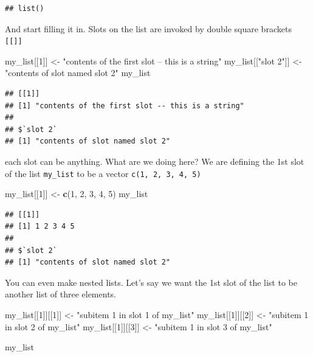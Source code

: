 \documentclass[]{book}
\newenvironment{Shaded}{\begin{snugshade}}{\end{snugshade}}
\newcommand{\KeywordTok}[1]{\textcolor[rgb]{0.13,0.29,0.53}{\textbf{#1}}}
\newcommand{\DecValTok}[1]{\textcolor[rgb]{0.00,0.00,0.81}{#1}}
\newcommand{\StringTok}[1]{\textcolor[rgb]{0.31,0.60,0.02}{#1}}
\newcommand{\NormalTok}[1]{#1}
\theoremstyle{definition}
\theoremstyle{definition}
\theoremstyle{definition}
\theoremstyle{remark}
\begin{document}
\begin{verbatim}
## list()
\end{verbatim}

And start filling it in. Slots on the list are invoked by double square
brackets \texttt{{[}{[}{]}{]}}

\begin{Shaded}
\begin{Highlighting}[]
\NormalTok{my_list[[}\DecValTok{1}\NormalTok{]] <-}\StringTok{ "contents of the first slot -- this is a string"}
\NormalTok{my_list[[}\StringTok{"slot 2"}\NormalTok{]] <-}\StringTok{ "contents of slot named slot 2"}
\NormalTok{my_list}
\end{Highlighting}
\end{Shaded}

\begin{verbatim}
## [[1]]
## [1] "contents of the first slot -- this is a string"
## 
## $`slot 2`
## [1] "contents of slot named slot 2"
\end{verbatim}

each slot can be anything. What are we doing here? We are defining the
1st slot of the list \texttt{my\_list} to be a vector
\texttt{c(1,\ 2,\ 3,\ 4,\ 5)}

\begin{Shaded}
\begin{Highlighting}[]
\NormalTok{my_list[[}\DecValTok{1}\NormalTok{]] <-}\StringTok{ }\KeywordTok{c}\NormalTok{(}\DecValTok{1}\NormalTok{, }\DecValTok{2}\NormalTok{, }\DecValTok{3}\NormalTok{, }\DecValTok{4}\NormalTok{, }\DecValTok{5}\NormalTok{)}
\NormalTok{my_list}
\end{Highlighting}
\end{Shaded}

\begin{verbatim}
## [[1]]
## [1] 1 2 3 4 5
## 
## $`slot 2`
## [1] "contents of slot named slot 2"
\end{verbatim}

You can even make nested lists. Let's say we want the 1st slot of the
list to be another list of three elements.

\begin{Shaded}
\begin{Highlighting}[]
\NormalTok{my_list[[}\DecValTok{1}\NormalTok{]][[}\DecValTok{1}\NormalTok{]] <-}\StringTok{ "subitem 1 in slot 1 of my_list"}
\NormalTok{my_list[[}\DecValTok{1}\NormalTok{]][[}\DecValTok{2}\NormalTok{]] <-}\StringTok{ "subitem 1 in slot 2 of my_list"}
\NormalTok{my_list[[}\DecValTok{1}\NormalTok{]][[}\DecValTok{3}\NormalTok{]] <-}\StringTok{ "subitem 1 in slot 3 of my_list"}

\NormalTok{my_list}
\end{Highlighting}
\end{Shaded}
\end{document}
